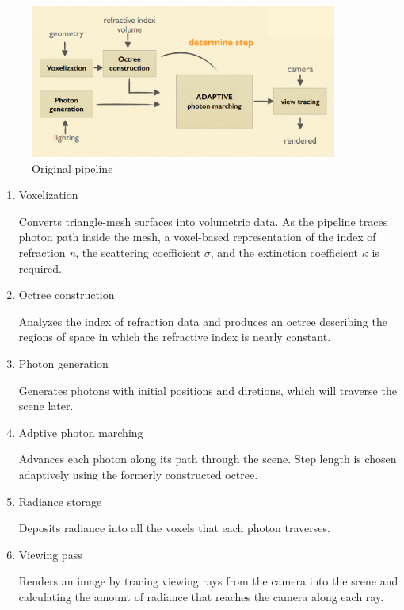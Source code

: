 \documentclass[a4paper]{article}
\begin{document}
\begin{CJK*}{UTF8}{gkai}
\begin{figure}[H]
\centering
\includegraphics[width=0.9\textwidth]{pipeline.png}
\caption{\label{fig:pipeline}Original pipeline}
\end{figure}


\begin{enumerate}
\item Voxelization

Converts triangle-mesh surfaces into volumetric data. As the pipeline traces photon path inside the mesh, a voxel-based representation of the index of refraction \textit{n}, the scattering coefficient $\sigma$, and the extinction coefficient $\kappa$ is required.

\item Octree construction

Analyzes the index of refraction data and produces an octree describing the regions of space in which the refractive index is nearly constant.

\item Photon generation

Generates photons with initial positions and diretions, which will traverse the scene later. 

\item Adptive photon marching

Advances each photon along its path through the scene. Step length is chosen adaptively using the formerly constructed octree.

\item Radiance storage

Deposits radiance into all the voxels that each photon traverses.

\item Viewing pass

Renders an image by tracing viewing rays from the camera into the scene and calculating the amount of radiance that reaches the camera along each ray.


\end{enumerate}
\end{CJK*}
\end{document}
